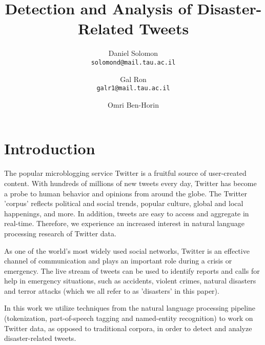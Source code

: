 \documentclass[letterpaper,twocolumn,10pt]{article}
\begin{document}
\date{}

\title{\Large \bf Detection and Analysis of Disaster-Related Tweets}

\author{
{\rm Daniel Solomon}\\
\texttt{solomond@mail.tau.ac.il}
\and
{\rm Gal Ron}\\
\texttt{galr1@mail.tau.ac.il‬}
\and
{\rm Omri Ben-Horin}\\
\texttt{}
}

\maketitle

\thispagestyle{empty}


\abstract{}
\todo{}

\section{Introduction}
The popular microblogging service Twitter is a fruitful source of user-created content. With hundreds of millions of new tweets every day, Twitter has become a probe to human behavior and opinions from around the globe. The Twitter 'corpus' reflects political and social trends, popular culture, global and local happenings, and more. In addition, tweets are easy to access and aggregate in real-time. Therefore, we experience an increased interest in natural language processing research of Twitter data.

As one of the world's most widely used social networks, Twitter is an effective channel of communication and plays an important role during a crisis or emergency. The live stream of tweets can be used to identify reports and calls for help in emergency situations, such as accidents, violent crimes, natural disasters and terror attacks (which we all refer to as 'disasters' in this paper).

In this work we utilize techniques from the natural language processing pipeline (tokenization, part-of-speech tagging and named-entity recognition) to work on Twitter data, as opposed to traditional corpora, in order to detect and analyze disaster-related tweets.
\end{document}
